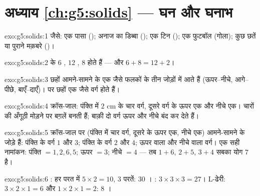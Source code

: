 \section*{अध्याय \ref{ch:g5:solids} --- घन और घनाभ}

\begin{solution}{exo:g5:solids:1}
जैसे: एक पासा (); अनाज का डिब्बा (); एक टिन (); एक
फुटबॉल (गोला); कुछ छतें या पुराने मक़बरे
()।
\end{solution}

\begin{solution}{exo:g5:solids:2}
 के $6$ , $12$ , $8$  होते हैं --- और
$6 + 8 = 12 + 2$। \checkmark
\end{solution}

\begin{solution}{exo:g5:solids:3}
छहों  आमने-सामने के एक जैसे फलकों के तीन जोड़ों में आते हैं
(ऊपर--नीचे, आगे--पीछे, बाएँ--दाएँ)।  पर छहों  एक जैसे
वर्ग होते हैं।
\end{solution}

\begin{solution}{exo:g5:solids:4}
क्रॉस-जाल: पंक्ति में $2$ cm के चार वर्ग, दूसरे वर्ग के ऊपर एक
और नीचे एक। चारों की अँगूठी मोड़ने पर बग़लें बनती हैं; बाक़ी दो
वर्ग ऊपर और नीचे बंद कर देते हैं।
\end{solution}

\begin{solution}{exo:g5:solids:5}
क्रॉस-जाल पर (पंक्ति में चार वर्ग, दूसरे के ऊपर एक, नीचे एक)
आमने-सामने के जोड़े हैं: पंक्ति के वर्ग $1$ और $3$; पंक्ति के
वर्ग $2$ और $4$; ऊपर वाला और नीचे वाला वर्ग। एक सही नामांकन:
पंक्ति $= 1, 2, 6, 5$; ऊपर $= 3$; नीचे $= 4$ --- तब
$1{+}6$, $2{+}5$, $3{+}4$ सबका योग $7$ है।
\end{solution}

\begin{solution}{exo:g5:solids:6}
: हर परत में $5 \times 2 = 10$, $3$ परतें: $30$ । :
$3 \times 3 \times 3 = 27$। L-ढेरी: $3 \times 2 \times 1 = 6$ और
$1 \times 2 \times 1 = 2$: $8$ ।
\end{solution}

